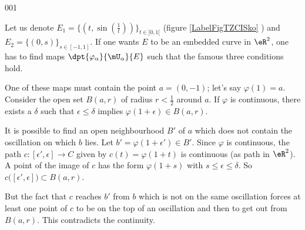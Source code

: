 \begin{corrige}{001}
 
 
    Let us denote $E_1=\{(t,\sin(\frac{1}{t}))\}_{t\in]0,1[}$ (figure \ref{LabelFigTZCISko} ) and $E_2=\{(0,s)\}_{s\in[-1,1]}$. 
If one wants $E$ to be an embedded curve in $\eR^2$, one has to find maps $\dpt{ \varphi_{\alpha} }{ \mU_{\alpha} }{ E }$ such that the famous three conditions hold.


\newcommand{\CaptionFigTZCISko}{The graph of the function \( x\mapsto \sin(1/x).\)}



One of these maps must contain the point $a=(0,-1)$; let's say $\varphi(1)=a$. Consider the open set $B(a,r)$ of radius $r<\frac{ 1 }{2}$ around $a$. If $\varphi$ is continuous, there exists a $\delta$ such that $\epsilon\leq\delta$ implies $\varphi(1+\epsilon)\in B(a,r)$. 

It is possible to find an open neighbourhood $B'$ of $a$ which does not contain the oscillation on which $b$ lies. Let $b'=\varphi(1+\epsilon')\in B'$. Since $\varphi$ is continuous, the path $c\colon [\epsilon',\epsilon]\to C$ given by $c(t)=\varphi(1+t)$ is continuous (as path in $\eR^2$). A point of the image of $c$ has the form $\varphi(1+s)$ with $s\leq\epsilon\leq\delta$. So $c\big( [\epsilon',\epsilon] \big)\subset B(a,r)$.

But the fact that $c$ reaches $b'$ from $b$ which is not on the same oscillation forces at least one point of $c$ to be on the top of an oscillation and then to get out from $B(a,r)$. This contradicts the continuity.

\end{corrige}
